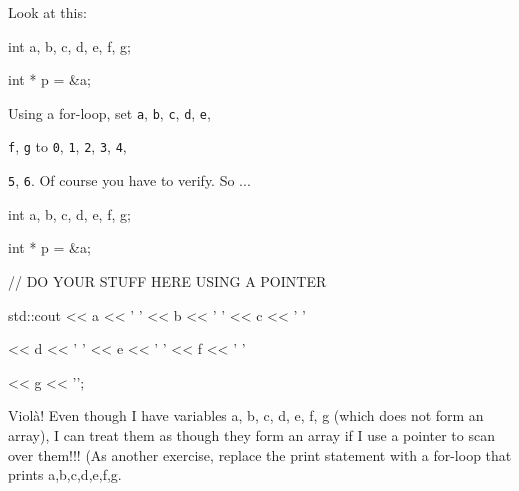 Look at this:



\begin{consolethree}[escapeinside=||]

int a, b, c, d, e, f, g;

int * p = &a;

\end{consolethree}



Using a for-loop, set \texttt{a}, \texttt{b}, \texttt{c}, \texttt{d}, \texttt{e},

\texttt{f}, \texttt{g} to \texttt{0}, \texttt{1}, \texttt{2}, \texttt{3}, \texttt{4},

\texttt{5}, \texttt{6}. Of course you have to verify. So ...



\begin{consolethree}[escapeinside=||]

int a, b, c, d, e, f, g;

int * p = &a;

// DO YOUR STUFF HERE USING A POINTER

std::cout << a << ' ' << b << ' ' << c << ' '

          << d << ' ' << e << ' ' << f << ' '

          << g << '\n';

\end{consolethree}



Violà! Even though I have variables a, b, c, d, e, f, g (which does not form an array), I can treat them as though they form an array if I use a pointer to scan over them!!! (As another exercise, replace the print statement with a for-loop that prints a,b,c,d,e,f,g.

